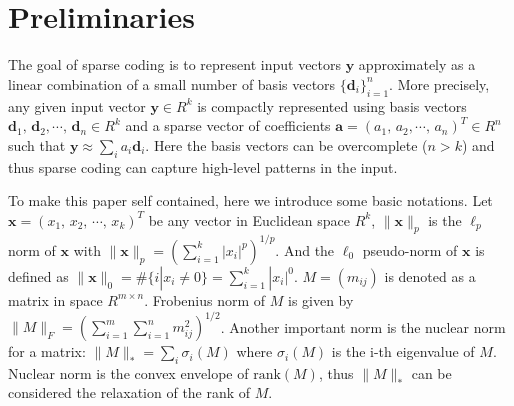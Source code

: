 \section{Preliminaries}
\label{sec:preliminaries}
The goal of sparse coding is to represent input vectors $\mathbf{y}$ approximately as a linear combination of a small number of basis vectors $\{\mathbf{d}_i\}_{i=1}^n$.
More precisely, any given input vector $\mathbf{y}\in R^k$ is compactly represented using basis vectors $\mathbf{d}_1,\,\mathbf{d}_2,\cdots,\,\mathbf{d}_n\in R^k$ and a sparse vector of coefficients $\mathbf{a}=(a_1,\,a_2,\cdots ,\,a_n)^T\in R^n$ such that $\mathbf{y} \approx \sum_i a_i\mathbf{d}_i$.
Here the basis vectors can be overcomplete ($n>k$) and thus sparse coding can capture high-level patterns in the input.

To make this paper self contained, here we introduce some basic notations.
Let $\mathbf{x}=(x_1,\,x_2,\,\cdots ,\,x_k)^T$ be any vector in Euclidean space $R^k$, $\|\mathbf{x}\|_p$  is the $\ell_p$ norm of $\mathbf{x}$ with $\|\mathbf{x}\|_p=(\sum_{i=1}^k |x_i|^p)^{1/p}$. And the $\ell_0$ pseudo-norm of $\mathbf{x}$ is defined as $\|\mathbf{x}\|_0=\#\{i|x_i\neq 0\}=\sum_{i=1}^k |x_i|^0$.
$M=(m_{ij})$ is denoted as a matrix in space $R^{m\times n}$.
Frobenius norm of $M$ is given by $\|M\|_F=(\sum_{i=1}^m\sum_{i=1}^n m_{ij}^2)^{1/2}$.
Another important norm is the nuclear norm for a matrix: $\|M\|_* = \sum_i \sigma_i(M)$ where $\sigma_i(M)$ is the i-th eigenvalue of $M$.
Nuclear norm is the convex envelope of $\mathrm{rank}(M)$, thus $\|M\|_*$ can be considered the relaxation of the rank of $M$.
